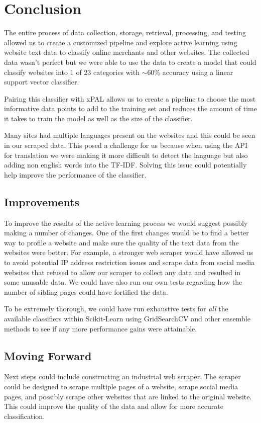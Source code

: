 \chapter*{Conclusion}

The entire process of data collection, storage, retrieval, processing, and testing allowed us to create a customized pipeline and explore active learning using website text data to classify online merchants and other websites. The collected data wasn't perfect but we were able to use the data to create a model that could classify websites into 1 of 23 categories with $\sim$60\% accuracy using a linear support vector classifier.

Pairing this classifier with xPAL allows us to create a pipeline to choose the most informative data points to add to the training set and reduces the amount of time it takes to train the model as well as the size of the classifier.

Many sites had multiple languages present on the websites and this could be seen in our scraped data. This posed a challenge for us because when using the API for translation we were making it more difficult to detect the language but also adding non english words into the TF-IDF. Solving this issue could potentially help improve the performance of the classifier. 

\section*{Improvements}

To improve the results of the active learning process we would suggest possibly making a number of changes. One of the first changes would be to find a better way to profile a website and make sure the quality of the text data from the websites were better. For example, a stronger web scraper would have allowed us to avoid potential IP address restriction issues and scrape data from social media websites that refused to allow our scraper to collect any data and resulted in some unusable data. We could have also run our own tests regarding how the number of sibling pages could have fortified the data.

To be extremely thorough, we could have run exhaustive tests for \textit{all} the available classifiers within Scikit-Learn using GridSearchCV and other ensemble methods to see if any more performance gains were attainable.

\section*{Moving Forward}

Next steps could include constructing an industrial web scraper. The scraper could be designed to scrape multiple pages of a website, scrape social media pages, and possibly scrape other websites that are linked to the original website. This could improve the quality of the data and allow for more accurate classification.